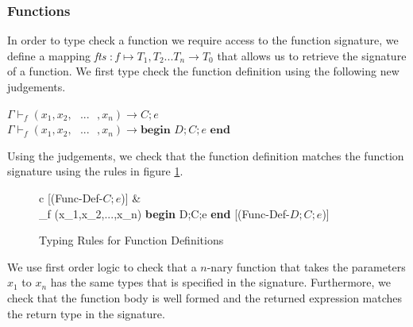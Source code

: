 \documentclass[a4paper,12pt]{report}
\begin{document}
\subsubsection{Functions}
In order to type check a function we require access to the function signature, we define 
a mapping \textit{fts} $: f \mapsto T_1,T_2...T_n \longrightarrow T_0$ 
that allows us to retrieve the signature of a function. We first type check the 
function definition using the following new judgements.
\begin{center}
    $\Gamma \vdash_{f} (x_1,x_2,\text{ }...\text{ },x_n) \longrightarrow C;e$\\
    $\Gamma \vdash_{f} (x_1,x_2,\text{ }...\text{ },x_n) \longrightarrow \textbf{begin }D;C;e\textbf{ end}$
\end{center}

\par
Using the judgements, we check that the function definition matches the function 
signature using the rules in figure \ref{fig:type_check_f_def}.
\begin{figure}[H]
  \begin{center}
    \begin{tabular} {c}
       [(Func-Def-$C;e$)]
      & \\
      {\Gamma \vdash_{f} (x_1,x_2,\text{ }...\text{ },x_n) \longrightarrow \textbf{begin }D;C;e\textbf{ end}} [(Func-Def-$D;C;e$)]
    \end{tabular}
  \end{center}
  \caption{Typing Rules for Function Definitions}
  \label{fig:type_check_f_def}
\end{figure}

\par
We use first order logic to check that a $n$-nary function that takes 
the parameters $x_1$ to $x_n$ has the same types that is specified in the 
signature. Furthermore, we check that the function body is well formed and 
the returned expression matches the return type in the signature. 
\end{document}
